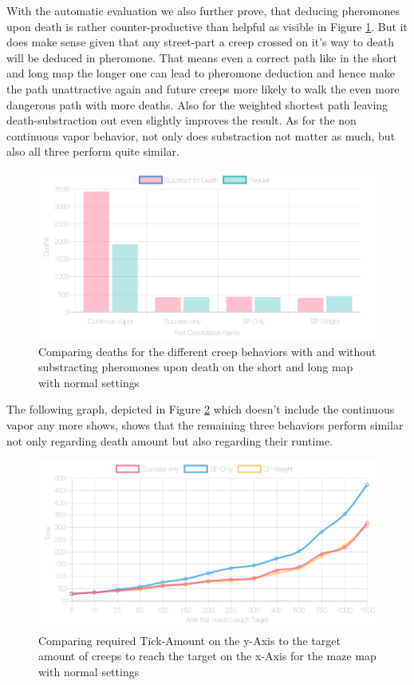 With the automatic evaluation we also further prove, that deducing pheromones upon death is rather counter-productive than helpful as visible in Figure \ref{fig:deathsubshitty}. But it does make sense given that any street-part a creep crossed on it's way to death will be deduced in pheromone. That means even a correct path like in the short and long map the longer one can lead to pheromone deduction and hence make the path unattractive again and future creeps more likely to walk the even more dangerous path with more deaths.
Also for the weighted shortest path leaving death-substraction out even slightly improves the result. As for the non continuous vapor behavior, not only does substraction not matter as much, but also all three perform quite similar.


\begin{figure}[H]
  \centering
  \includegraphics[width=1\linewidth]{images/normalshortandlongwithtowers-deaths}
  \caption{Comparing deaths for the different creep behaviors with and without substracting pheromones upon death on the short and long map with normal settings}
  \label{fig:deathsubshitty}
\end{figure}

The following graph, depicted in Figure \ref{fig:threesame} which doesn't include the continuous vapor any more shows, shows that the remaining three behaviors perform similar not only regarding death amount but also regarding their runtime.

\begin{figure}[H]
  \centering
  \includegraphics[width=1\linewidth]{images/normalsquaremaze-ticks-line}
  \caption{Comparing required Tick-Amount on the y-Axis to the target amount of creeps to reach the target on the x-Axis for the maze map with normal settings}
  \label{fig:threesame}
\end{figure}

